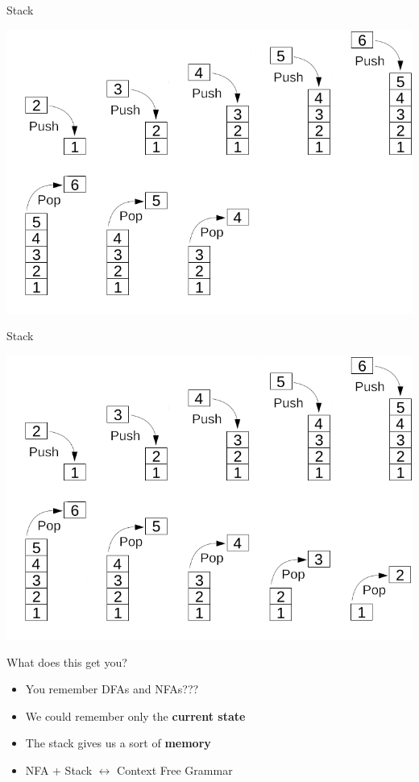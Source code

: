\documentclass[aspectratio=169]{beamer}
\begin{document}
\begin{frame}{Stack}
    \begin{center}
        \includegraphics[scale=0.4625]{images/stack/Stack_7.png}
    \end{center}
\end{frame}

\begin{frame}{Stack}
    \begin{center}
        \includegraphics[scale=0.4625]{images/stack/Stack_8.png}
    \end{center}
\end{frame}

\begin{frame}{What does this get you?}
    \begin{itemize}
        \item You remember DFAs and NFAs??? \pause
        \item We could remember only the \textbf{current state} \pause
        \item The stack gives us a sort of \textbf{memory} \pause
        \item NFA + Stack $\leftrightarrow$ Context Free Grammar
    \end{itemize}
\end{frame}
\end{document}
